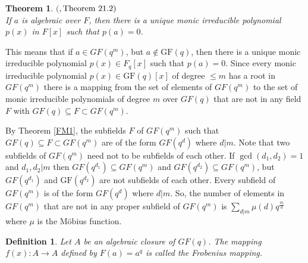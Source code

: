 \documentclass[11pt]{amsart}
\newcommand{\GF}{\mathrm{GF}}
\newtheorem{definition}{{\bf Definition}}
\newtheorem{theorem}{{\bf Theorem }}
\begin{document}
\begin{theorem}$($\cite{G}$, \textnormal{Theorem }21.2)$\\
If $a$ is algebraic over $F$, then there is a unique monic irreducible polynomial $p(x)$ in $F[x]$ such that $p(a)=0$.
\end{theorem}

This means that if $a\in GF(q^m)$, but $a \notin \GF(q)$, then there is a unique monic irreducible polynomial $p(x) \in F_{q}[x]$ such that $p(a) = 0$. Since every monic irreducible polynomial $p(x)\in \GF(q)[x]$ of degree $\leqslant m$ has a root in $GF(q^m)$ there is a mapping from the set of elements of $GF(q^m)$ to the set of monic irreducible polynomials of degree $m$ over $GF(q)$ that are not in any field $F$ with $GF(q) \subseteq F \subset GF(q^m)$. 

By Theorem \ref{FM1}, the subfields $F$ of $GF(q^m)$ such that $GF(q) \subseteq F \subset GF(q^m)$ are of the form $GF(q^d)$ where $d |m$. Note that two subfields of $GF(q^m)$ need not to be subfields of each other. If $\gcd(d_1, d_2) = 1$ and $d_1,d_2 |m$ then $GF(q^{d_1}) \subseteq GF(q^m)$ and $GF(q^{d_2}) \subseteq GF(q^m)$, but $GF(q^{d_1})$ and $\GF(q^{d_2})$ are not subfields of each other. Every subfield of $GF(q^m)$ is of the form $GF(q^d)$ where $d\vert m$. So, the number of elements in $GF(q^m)$ that are not in any proper subfield of $GF(q^m)$ is $ \sum_{d|m} \mu (d) q^{\frac{m}{d}}$ where $\mu$ is the  M\"obius function.


\begin{definition}
Let $A$ be an algebraic closure of $GF(q)$. The mapping $f(x): A \rightarrow A$ defined by $F(a) = a^q$ is called the \emph {Frobenius mapping}.
\end{definition}


\end{document}
